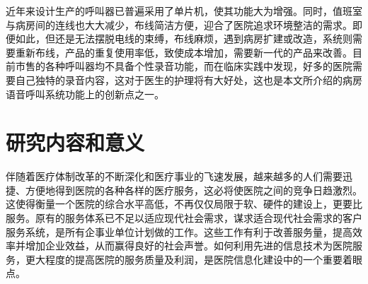 近{\cf}年来{\cf}设计{\cf}生产{\cf}的呼{\cf}叫器{\cf}已普{\cf}遍采{\cf}用了{\cf}单片{\cf}机，{\cf}使其{\cf}功能{\cf}大为{\cf}增强{\cf}。同{\cf}时，{\cf}值班{\cf}室与{\cf}病房{\cf}间的{\cf}连线{\cf}也大{\cf}大减{\cf}少，{\cf}布线{\cf}简洁{\cf}方便{\cf}，迎{\cf}合了{\cf}医院{\cf}追求{\cf}环境{\cf}整洁{\cf}的需{\cf}求。{\cf}即便{\cf}如此{\cf}，但{\cf}还是{\cf}无法{\cf}摆脱{\cf}电线{\cf}的束{\cf}缚，{\cf}布线{\cf}麻烦{\cf}，遇{\cf}到病{\cf}房扩{\cf}建或{\cf}改造{\cf}，系{\cf}统则{\cf}需要{\cf}重新{\cf}布线{\cf}，产{\cf}品的{\cf}重复{\cf}使用{\cf}率低{\cf}，致{\cf}使成{\cf}本增{\cf}加，{\cf}需要{\cf}新一{\cf}代的{\cf}产品{\cf}来改{\cf}善。{\cf}目前{\cf}市售{\cf}的各{\cf}种呼{\cf}叫器{\cf}均不{\cf}具备{\cf}个性{\cf}录音{\cf}功能{\cf}，而{\cf}在临{\cf}床实{\cf}践中{\cf}发现{\cf}，好{\cf}多的{\cf}医院{\cf}需要{\cf}自己{\cf}独特{\cf}的录{\cf}音内{\cf}容，{\cf}这对{\cf}于医{\cf}生的{\cf}护理{\cf}将有{\cf}大好{\cf}处，{\cf}这也{\cf}是本{\cf}文所{\cf}介绍{\cf}的病{\cf}房语{\cf}音呼{\cf}叫系{\cf}统功{\cf}能上{\cf}的创{\cf}新点之一。

\section{研究内容和意义}
伴{\cf}随着{\cf}医疗{\cf}体制{\cf}改革{\cf}的不{\cf}断深{\cf}化和{\cf}医疗{\cf}事业{\cf}的飞{\cf}速发{\cf}展，{\cf}越来{\cf}越多{\cf}的人{\cf}们需{\cf}要迅{\cf}捷、{\cf}方便{\cf}地得{\cf}到医{\cf}院的{\cf}各种{\cf}各样{\cf}的医{\cf}疗服{\cf}务，{\cf}这必{\cf}将使{\cf}医院{\cf}之间{\cf}的竞{\cf}争日{\cf}趋激{\cf}烈。{\cf}这使{\cf}得衡{\cf}量一{\cf}个医{\cf}院的{\cf}综合{\cf}水平{\cf}高低{\cf}，不{\cf}再仅{\cf}仅局{\cf}限于{\cf}软、{\cf}硬件{\cf}的建{\cf}设上{\cf}，更{\cf}要比{\cf}服务{\cf}。原{\cf}有的{\cf}服务{\cf}体系{\cf}已不{\cf}足以{\cf}适应{\cf}现代{\cf}社会{\cf}需求{\cf}，谋{\cf}求适{\cf}合现{\cf}代社{\cf}会需{\cf}求的{\cf}客户{\cf}服务{\cf}系统{\cf}，是{\cf}所有{\cf}企事{\cf}业单{\cf}位计{\cf}划做{\cf}的工{\cf}作。{\cf}这些{\cf}工作{\cf}有利{\cf}于改{\cf}善服{\cf}务量{\cf}，提{\cf}高效{\cf}率并{\cf}增加{\cf}企业{\cf}效益{\cf}，从{\cf}而赢{\cf}得良{\cf}好的{\cf}社会{\cf}声誉{\cf}。如{\cf}何利{\cf}用先{\cf}进的{\cf}信息{\cf}技术{\cf}为医{\cf}院服{\cf}务，{\cf}更大{\cf}程度{\cf}的提{\cf}高医{\cf}院的{\cf}服务{\cf}质量{\cf}及利{\cf}润，{\cf}是医{\cf}院信{\cf}息化{\cf}建设{\cf}中的{\cf}一个{\cf}重要{\cf}着眼{\cf}点。

